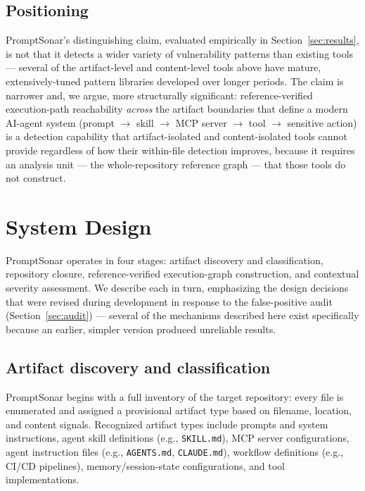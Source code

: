 \documentclass[sigconf,anonymous,review]{acmart}
\newcommand{\sysname}{PromptSonar}
\begin{document}
\subsection{Positioning}
\label{sec:positioning}
\sysname{}'s distinguishing claim, evaluated empirically in Section~\ref{sec:results}, is not that it detects a wider variety of vulnerability patterns than existing tools --- several of the artifact-level and content-level tools above have mature, extensively-tuned pattern libraries developed over longer periods. The claim is narrower and, we argue, more structurally significant: reference-verified execution-path reachability \emph{across} the artifact boundaries that define a modern AI-agent system (prompt $\rightarrow$ skill $\rightarrow$ MCP server $\rightarrow$ tool $\rightarrow$ sensitive action) is a detection capability that artifact-isolated and content-isolated tools cannot provide regardless of how their within-file detection improves, because it requires an analysis unit --- the whole-repository reference graph --- that those tools do not construct.

\section{System Design}
\label{sec:design}
\sysname{} operates in four stages: artifact discovery and classification, repository closure, reference-verified execution-graph construction, and contextual severity assessment. We describe each in turn, emphasizing the design decisions that were revised during development in response to the false-positive audit (Section~\ref{sec:audit}) --- several of the mechanisms described here exist specifically because an earlier, simpler version produced unreliable results.

\subsection{Artifact discovery and classification}
\label{sec:classify}
\sysname{} begins with a full inventory of the target repository: every file is enumerated and assigned a provisional artifact type based on filename, location, and content signals. Recognized artifact types include prompts and system instructions, agent skill definitions (e.g., \texttt{SKILL.md}), MCP server configurations, agent instruction files (e.g., \texttt{AGENTS.md}, \texttt{CLAUDE.md}), workflow definitions (e.g., CI/CD pipelines), memory/session-state configurations, and tool implementations.
\end{document}
